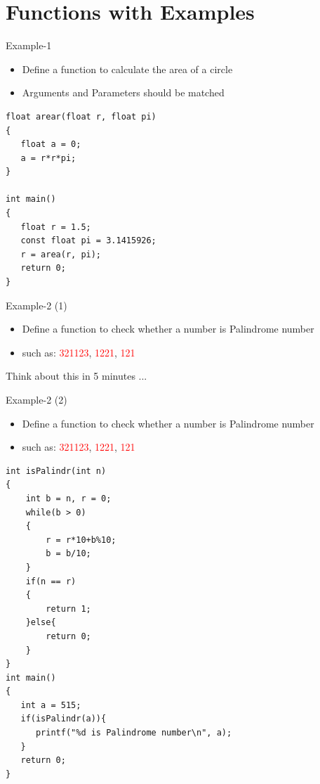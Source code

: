 \section{Functions with Examples}
\label{sec:example}
\begin{frame}[fragile]{Example-1}
\begin{itemize}
	\item {Define a function to calculate the area of a circle}
	\item {Arguments and Parameters should be matched}
\end{itemize}
\begin{lstlisting}
float arear(float r, float pi)
{
   float a = 0;
   a = r*r*pi;
}

int main()
{
   float r = 1.5;
   const float pi = 3.1415926;
   r = area(r, pi);
   return 0;
}
\end{lstlisting}
\end{frame}

\begin{frame}[fragile]{Example-2 (1)}
\begin{itemize}
	\item {Define a function to check whether a number is Palindrome number}
	\item {such as: \textcolor{red}{321123}, \textcolor{red}{1221}, \textcolor{red}{121}}
\end{itemize}
\begin{center}
	\Large{
	Think about this in 5 minutes ...
	}
\end{center}
\end{frame}

\begin{frame}[fragile]{Example-2 (2)}
\begin{itemize}
	\item {Define a function to check whether a number is Palindrome number}
	\item {such as: \textcolor{red}{321123}, \textcolor{red}{1221}, \textcolor{red}{121}}
\end{itemize}
\begin{lstlisting}
int isPalindr(int n)
{
    int b = n, r = 0;
    while(b > 0)
    {
        r = r*10+b%10;
        b = b/10;
    }
    if(n == r)
    {
        return 1;
    }else{
        return 0;
    }
}
int main()
{
   int a = 515;
   if(isPalindr(a)){
      printf("%d is Palindrome number\n", a);
   }
   return 0;
}
\end{lstlisting}
\end{frame}

